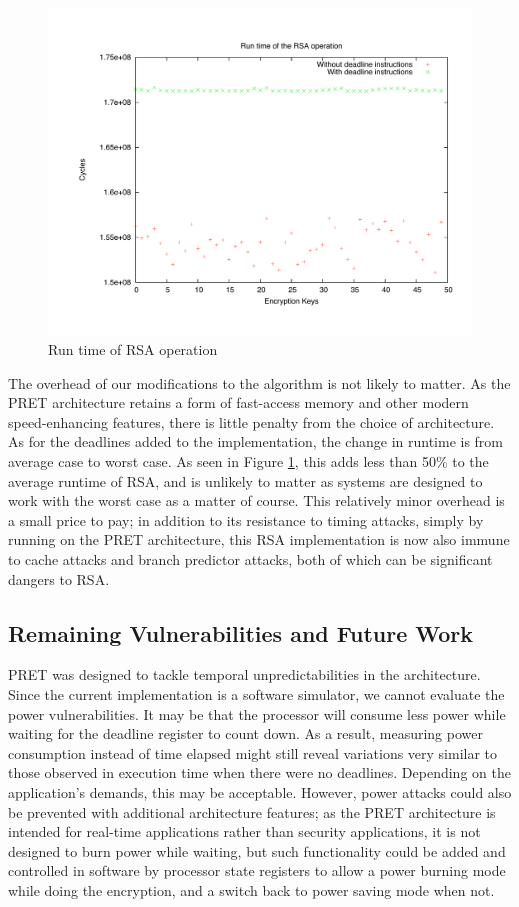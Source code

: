 \documentclass[times, 10pt,twocolumn]{article}
\begin{document}
\begin{figure}[ht]
  \centering
  \includegraphics[scale=.3]{./images/RSA.pdf}
  \caption{Run time of RSA operation}
  \label{fig:rsa}
\end{figure}

The overhead of our modifications to the algorithm is not likely to matter.  As the PRET architecture retains a form of fast-access memory and other modern speed-enhancing features, there is little penalty from the choice of architecture.  As for the deadlines added to the implementation, the change in runtime is from average case to worst case.  As seen in Figure \ref{fig:rsa}, this adds less than 50\% to the average runtime of RSA, and is unlikely to matter as systems are designed to work with the worst case as a matter of course.  This relatively minor overhead is a small price to pay; in addition to its resistance to timing attacks, simply by running on the PRET architecture, this RSA implementation is now also immune to cache attacks and branch predictor attacks, both of which can be significant dangers to RSA\cite{branchpredict, Percival05cachemissing}.

\subsection{Remaining Vulnerabilities and Future Work}
PRET was designed to tackle temporal unpredictabilities in the architecture. Since the current implementation is a software simulator, we cannot evaluate the power vulnerabilities. It may be that the processor will consume less power while waiting for the deadline register to count down. As a result, measuring power consumption instead of time elapsed might still reveal variations very similar to those observed in execution time when there were no deadlines.  Depending on the application's demands, this may be acceptable.  However, power attacks could also be prevented with additional architecture features; as the PRET architecture is intended for real-time applications rather than security applications, it is not designed to burn power while waiting, but such functionality could be added and controlled in software by processor state registers to allow a power burning mode while doing the encryption, and a switch back to power saving mode when not.  
\end{document}

